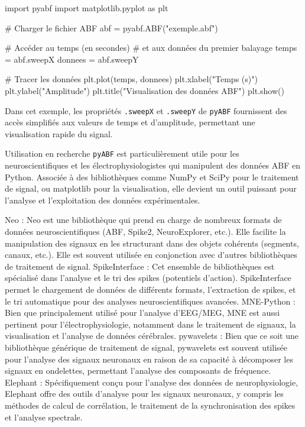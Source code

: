 \documentclass[a4paper,9pt]{extarticle}
\begin{document}
\begin{multicols}{2}
\begin{iplisting}
import pyabf
import matplotlib.pyplot as plt

# Charger le fichier ABF
abf = pyabf.ABF("exemple.abf")

# Accéder au temps (en secondes) 
#     et aux données du premier balayage
temps = abf.sweepX
donnees = abf.sweepY

# Tracer les données
plt.plot(temps, donnees)
plt.xlabel("Temps (s)")
plt.ylabel("Amplitude")
plt.title("Visualisation des données ABF")
plt.show()
\end{iplisting}
Dans cet exemple, les propriétés \texttt{.sweepX} et \texttt{.sweepY} de \texttt{pyABF} fournissent des accès simplifiés aux valeurs de temps et d’amplitude, permettant une visualisation rapide du signal.

Utilisation en recherche
\texttt{pyABF} est particulièrement utile pour les neuroscientifiques et les électrophysiologistes qui manipulent des données ABF en Python. Associée à des bibliothèques comme NumPy et SciPy pour le traitement de signal, ou matplotlib pour la visualisation, elle devient un outil puissant pour l’analyse et l’exploitation des données expérimentales.

Neo : Neo est une bibliothèque qui prend en charge de nombreux formats de données neuroscientifiques (ABF, Spike2, NeuroExplorer, etc.). Elle facilite la manipulation des signaux en les structurant dans des objets cohérents (segments, canaux, etc.). Elle est souvent utilisée en conjonction avec d'autres bibliothèques de traitement de signal.
SpikeInterface : Cet ensemble de bibliothèques est spécialisé dans l'analyse et le tri des spikes (potentiels d'action). SpikeInterface permet le chargement de données de différents formats, l’extraction de spikes, et le tri automatique pour des analyses neuroscientifiques avancées.
MNE-Python : Bien que principalement utilisé pour l’analyse d'EEG/MEG, MNE est aussi pertinent pour l’électrophysiologie, notamment dans le traitement de signaux, la visualisation et l'analyse de données cérébrales.
pywavelets : Bien que ce soit une bibliothèque générique de traitement de signal, pywavelets est souvent utilisée pour l'analyse des signaux neuronaux en raison de sa capacité à décomposer les signaux en ondelettes, permettant l'analyse des composants de fréquence.
Elephant : Spécifiquement conçu pour l'analyse des données de neurophysiologie, Elephant offre des outils d'analyse pour les signaux neuronaux, y compris les méthodes de calcul de corrélation, le traitement de la synchronisation des spikes et l'analyse spectrale.




\end{multicols}
\end{document}
